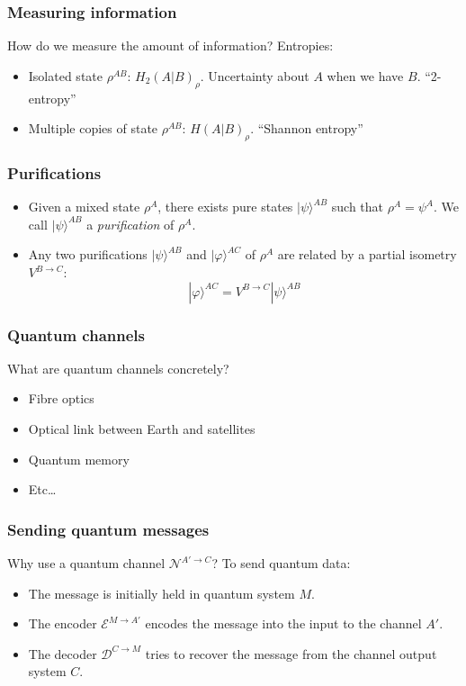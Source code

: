 \documentclass[12pt]{beamer}
\newcommand{\ket}[1]{|#1 \rangle}
\begin{document}
\begin{frame}
	\frametitle{Measuring information}
	How do we measure the amount of information? Entropies:
	\begin{itemize}
		\item Isolated state $\rho^{AB}$: $H_2(A|B)_{\rho}$. Uncertainty about $A$ when we have $B$. ``2-entropy''
		\item Multiple copies of state $\rho^{AB}$: $H(A|B)_{\rho}$. ``Shannon entropy''
	\end{itemize}
\end{frame}

\begin{frame}
\frametitle{Purifications}
\begin{itemize}
\item Given a mixed state $\rho^A$, there exists pure states $\ket{\psi}^{AB}$ such that $\rho^A = \psi^A$. We call $\ket{\psi}^{AB}$ a \emph{purification} of $\rho^A$.
\item Any two purifications $\ket{\psi}^{AB}$ and $\ket{\varphi}^{AC}$ of $\rho^A$ are related by a partial isometry $V^{B \rightarrow C}$:
\[ \ket{\varphi}^{AC} = V^{B \rightarrow C} \ket{\psi}^{AB} \]
\end{itemize}
\end{frame}

\begin{frame}
\frametitle{Quantum channels}
What are quantum channels concretely?

    \begin{itemize}
        \item Fibre optics
\item Optical link between Earth and satellites
	\item Quantum memory
	\item Etc\ldots
    \end{itemize}
\end{frame}

\begin{frame}
\frametitle{Sending quantum messages}
Why use a quantum channel $\mathcal{N}^{A' \rightarrow C}$? To send quantum data:
\begin{itemize}
\item The message is initially held in quantum system $M$.
\item The encoder $\mathcal{E}^{M \rightarrow A'}$ encodes the message into the input to the channel $A'$.
\item The decoder $\mathcal{D}^{C \rightarrow M}$ tries to recover the message from the channel output system $C$.
\end{itemize}
    \begin{figure}
    \scalebox{1}{}
    \end{figure}
\end{frame}
\end{document}
